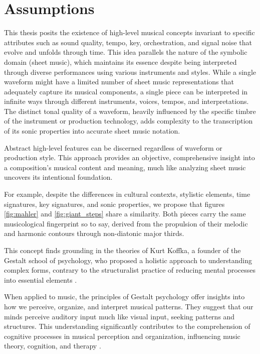 \section{Assumptions}

This thesis posits the existence of high-level musical concepts invariant to specific attributes such as sound quality, tempo, key, orchestration, and signal noise that evolve and unfolds through time. This idea parallels the nature of the symbolic domain (sheet music), which maintains its essence despite being interpreted through diverse performances using various instruments and styles. While a single waveform might have a limited number of sheet music representations that adequately capture its musical components, a single piece can be interpreted in infinite ways through different instruments, voices, tempos, and interpretations. The distinct tonal quality of a waveform, heavily influenced by the specific timbre of the instrument or production technology, adds complexity to the transcription of its sonic properties into accurate sheet music notation.

Abstract high-level features can be discerned regardless of waveform or production style. This approach provides an objective, comprehensive insight into a composition's musical content and meaning, much like analyzing sheet music uncovers its intentional foundation.

For example, despite the differences in cultural contexts, stylistic elements, time signatures, key signatures, and sonic properties, we propose that figures \ref{fig:mahler} and \ref{fig:giant_steps} share a similarity. Both pieces carry the same musicological fingerprint so to say, derived from the propulsion of their melodic and harmonic contours through non-diatonic major thirds.

This concept finds grounding in the theories of Kurt Koffka, a founder of the Gestalt school of psychology, who proposed a holistic approach to understanding complex forms, contrary to the structuralist practice of reducing mental processes into essential elements \cite{Koffka2013PrinciplesPsychology}.

When applied to music, the principles of Gestalt psychology offer insights into how we perceive, organize, and interpret musical patterns. They suggest that our minds perceive auditory input much like visual input, seeking patterns and structures. This understanding significantly contributes to the comprehension of cognitive processes in musical perception and organization, influencing music theory, cognition, and therapy \cite{Lerdahl1985AMusic}.

